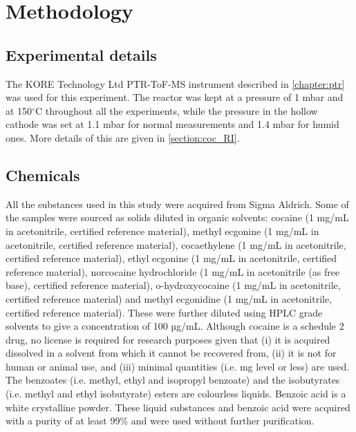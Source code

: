 





\section{Methodology}
 
\subsection{Experimental details}\label{section:coc_expdet}
The KORE Technology Ltd PTR-ToF-MS instrument described in \autoref{chapter:ptr} was used for this experiment. 
The reactor was kept at a pressure of 1 mbar and at 150$^\circ$C throughout all the experiments, while the pressure in the hollow cathode was set at 1.1 mbar for normal measurements and 1.4 mbar for humid ones. More details of this are given in \autoref{section:coc_RI}.


\subsection{Chemicals}
All the substances used in this study were acquired from Sigma Aldrich. Some of the samples were sourced as solids diluted in organic solvents: cocaine (1 mg/mL in acetonitrile, certified reference material), methyl ecgonine (1 mg/mL in acetonitrile, certified reference material), cocaethylene (1 mg/mL in acetonitrile, certified reference material), ethyl ecgonine (1 mg/mL in acetonitrile, certified reference material), norcocaine hydrochloride (1 mg/mL in acetonitrile (as free base), certified reference material), o-hydroxycocaine (1 mg/mL in acetonitrile, certified reference material) and methyl ecgonidine (1 mg/mL in acetonitrile, certified reference material). These were further diluted using HPLC grade solvents to give a concentration of 100 µg/mL. Although cocaine is a schedule 2 drug, no license is required for research purposes given that (i) it is acquired dissolved in a solvent from which it cannot be recovered from, (ii) it is not for human or animal use, and (iii) minimal quantities (i.e. mg level or less) are used.
The benzoates (i.e. methyl, ethyl and isopropyl benzoate) and the isobutyrates (i.e. methyl and ethyl isobutyrate) esters are colourless liquids. Benzoic acid is a white crystalline powder. These liquid substances and benzoic acid were acquired with a purity of at least 99\% and were used without further purification.



